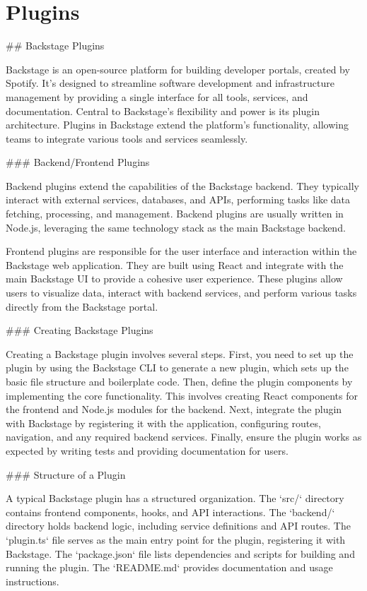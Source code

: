 \chapter{Plugins}
\label{ch:plugins}

## Backstage Plugins

Backstage is an open-source platform for building developer portals, created by Spotify. It's designed to streamline software development and infrastructure management by providing a single interface for all tools, services, and documentation. Central to Backstage's flexibility and power is its plugin architecture. Plugins in Backstage extend the platform's functionality, allowing teams to integrate various tools and services seamlessly.

### Backend/Frontend Plugins

Backend plugins extend the capabilities of the Backstage backend. They typically interact with external services, databases, and APIs, performing tasks like data fetching, processing, and management. Backend plugins are usually written in Node.js, leveraging the same technology stack as the main Backstage backend.

Frontend plugins are responsible for the user interface and interaction within the Backstage web application. They are built using React and integrate with the main Backstage UI to provide a cohesive user experience. These plugins allow users to visualize data, interact with backend services, and perform various tasks directly from the Backstage portal.

### Creating Backstage Plugins

Creating a Backstage plugin involves several steps. First, you need to set up the plugin by using the Backstage CLI to generate a new plugin, which sets up the basic file structure and boilerplate code. Then, define the plugin components by implementing the core functionality. This involves creating React components for the frontend and Node.js modules for the backend. Next, integrate the plugin with Backstage by registering it with the application, configuring routes, navigation, and any required backend services. Finally, ensure the plugin works as expected by writing tests and providing documentation for users.

### Structure of a Plugin

A typical Backstage plugin has a structured organization. The `src/` directory contains frontend components, hooks, and API interactions. The `backend/` directory holds backend logic, including service definitions and API routes. The `plugin.ts` file serves as the main entry point for the plugin, registering it with Backstage. The `package.json` file lists dependencies and scripts for building and running the plugin. The `README.md` provides documentation and usage instructions.

